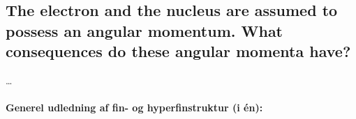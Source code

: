 \subsection{The electron and the nucleus are assumed to possess an angular momentum. What consequences do these angular momenta have?}


\ldots


\paragraph{Generel udledning af fin- og hyperfinstruktur (i én):}